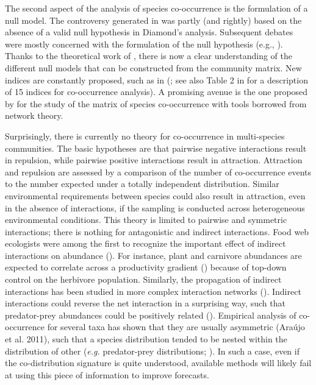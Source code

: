 The second aspect of the analysis of species co-occurrence is the formulation of a null model. The controversy generated in \cite{Connor1979Assembly} was partly (and rightly) based on the absence of a valid null hypothesis in Diamond’s analysis. Subsequent debates were mostly concerned with the formulation of the null hypothesis (e.g.,
\citealt{Diamond1982Examination}). Thanks to the theoretical work of
\cite{Gotelli1996Null}, there is now a clear understanding of the different
null models that can be constructed from the community matrix. New indices are
constantly proposed, such as in (\citealt{Boulangeat2012Accounting, Veech2013Probabilistic}; see also Table 2 in \citealt{Ulrich2013Pattern} for a description of 15 indices for co-occurrence analysis). A promising avenue is the one proposed by
\cite{Araujo2011Using} for the study of the matrix of species co-occurrence
with tools borrowed from network theory.

Surprisingly, there is currently no theory for co-occurrence in multi-species communities. The basic hypotheses are that pairwise negative interactions result in repulsion, while pairwise positive interactions result in attraction. Attraction and repulsion are assessed by a comparison of the number of co-occurrence events to the number expected under a totally independent distribution. Similar environmental requirements between species could also result in attraction, even in the absence of interactions, if the sampling is conducted across heterogeneous environmental conditions. This theory is limited to pairwise and symmetric interactions; there is nothing for antagonistic and indirect interactions. Food web ecologists were among the first to recognize the important effect of indirect interactions on abundance
(\citealt{Wootton1994Nature}). For instance, plant and carnivore abundances are expected to correlate across a productivity gradient
(\citealt{Hairston1960Community, Oksanen1981Exploitation}) because of top-down control on the herbivore population. Similarly, the propagation of indirect interactions has been studied in more complex interaction networks (\citealt{Yodzis1988Indeterminacy}). Indirect interactions could reverse the net interaction in a surprising way, such that predator-prey abundances could be positively related (\citealt{Montoya2009Press}). Empirical analysis of co-occurrence for several taxa has shown that they are usually asymmetric (Araújo et al. 2011), such that a species distribution tended to be nested within the distribution of other (\textit{e.g.} predator-prey distributions; \citealt{Holt2009Trophic, Gravel2011Trophic}). In such a case, even if the co-distribution signature is quite understood, available methods will likely fail at using this piece of information to improve forecasts.


